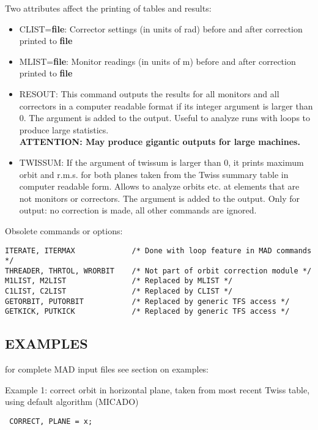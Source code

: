 Two attributes affect the printing of tables and results: 
\begin{itemize}
   \item CLIST=\textbf{file}: Corrector settings (in units of rad)
     before and after correction printed to \textbf{file} 

   \item MLIST=\textbf{file}: Monitor readings (in units of m) before
     and after correction printed to \textbf{file} 

   \item RESOUT: This command outputs the results for all monitors and
     all correctors in a computer readable format if its integer
     argument is larger than 0. The argument is added to the
     output. Useful to analyze runs with loops to produce large
     statistics. 
     \\\textbf{ATTENTION: May produce gigantic outputs for large machines.}
     \\

   \item TWISSUM:  If the argument of twissum is larger than 0, it
     prints maximum orbit and r.m.s. for both planes taken from the
     Twiss summary table in computer readable form. Allows to analyze
     orbits etc. at elements that are not monitors or correctors. The
     argument is added to the output.  Only for output: no correction is
     made, all other commands are ignored.  
\end{itemize}

Obsolete commands or options:
\begin{verbatim}
ITERATE, ITERMAX             /* Done with loop feature in MAD commands */
THREADER, THRTOL, WRORBIT    /* Not part of orbit correction module */
M1LIST, M2LIST               /* Replaced by MLIST */
C1LIST, C2LIST               /* Replaced by CLIST */
GETORBIT, PUTORBIT           /* Replaced by generic TFS access */
GETKICK, PUTKICK             /* Replaced by generic TFS access */
\end{verbatim}

\subsection{EXAMPLES} 

for complete MAD input files see section on examples:

Example 1: correct orbit in horizontal plane, taken from most recent
Twiss table, using default algorithm (MICADO)
\begin{verbatim}
 CORRECT, PLANE = x; 
\end{verbatim}

